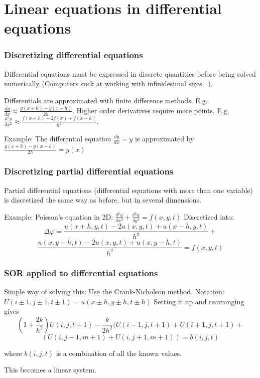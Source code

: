 \section{Linear equations in differential equations}

\begin{frame}
\frametitle{Discretizing differential equations}
Differential equations must be expressed in discrete quantities before being solved numerically (Computers suck at working with infinidesimal sizes...).

Differentials are approximated with finite difference methods. E.g. $\frac{dy}{dx}\approx \frac{y(x+h)-y(x-h)}{2h}$. Higher order derivatives require more points. E.g. $\frac{d^2y}{dx^2}\approx \frac{f(x+h)-2f(x)+f(x-h)}{h^2}$.

Example: The differential equation $\frac{dy}{dx} = y$ is approximated by $\frac{y(x+h)-y(x-h)}{2h} = y(x)$

\end{frame}

\begin{frame}
\frametitle{Discretizing partial differential equations}
Partial differential equations (differential equations with more than one variable) is discretized the same way as before, but in several dimensions.

Example: Poisson's equation in 2D: $\frac{\delta^2 u}{\delta x^2} + \frac{\delta^2 u}{\delta y^2} = f(x,y,t)$
Discretized into:
$$\Delta \varphi =
\frac{u(x+h,y,t)-2u(x,y,t)+u(x-h,y,t)}{h^2} + $$
$$
\frac{u(x,y+h,t)-2u(x,y,t)+u(x,y-h,t)}{h^2} = f(x,y,t)
$$

\end{frame}

\begin{frame}
\frametitle{SOR applied to differential equations}
Simple way of solving this: Use the Crank-Nicholson method. Notation: $U(i\pm 1,j\pm 1,t\pm 1)=u(x\pm h,y \pm h,t \pm h)$
Setting it up and rearranging gives
$$
(1+\frac{2k}{h^2})U(i,j,t+1)-\frac{k}{2h^2}(U(i-1,j,t+1)+U(i+1,j,t+1) + $$
$$(U(i,j-1,m+1) + U(i,j+1,m+1)) = b(i,j,t)
$$

where $b(i,j,t)$ is a combination of all the known values.

This becomes a linear system.

\end{frame}

